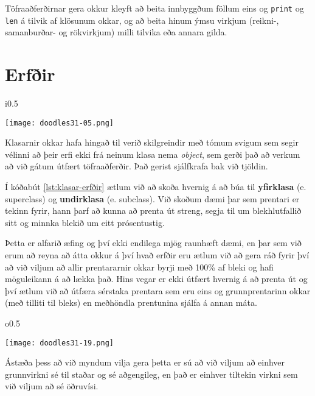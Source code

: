Töfraaðferðirnar gera okkur kleyft að beita innbyggðum föllum eins og \texttt{print} og \texttt{len} á tilvik af klösunum okkar, og að beita hinum ýmsu virkjum (reikni-, samanburðar- og rökvirkjum) milli tilvika eða annara gilda.


\section{Erfðir}\label{uk:klasar-erfðir}
\begin{wrapfigure}{i}{0.5\textwidth} %
	\begin{center}
		\texttt{[image: doodles31-05.png]}
	\end{center}
\end{wrapfigure}
Klasarnir okkar hafa hingað til verið skilgreindir með tómum svigum sem segir vélinni að þeir erfi ekki frá neinum klasa nema \textit{object}, sem gerði það að verkum að við gátum útfært töfraaðferðir.
Það gerist sjálfkrafa bak við tjöldin.

Í kóðabút \ref{lst:klasar-erfðir} ætlum við að skoða hvernig á að búa til \textbf{yfirklasa} (e. superclass) og \textbf{undirklasa} (e. subclass).
Við skoðum dæmi þar sem prentari er tekinn fyrir, hann þarf að kunna að prenta út streng, segja til um blekhlutfallið sitt og minnka blekið um eitt prósentustig.

Þetta er alfarið æfing og því ekki endilega mjög raunhæft dæmi, en þar sem við erum að reyna að átta okkur á því hvað erfðir eru ætlum við að gera ráð fyrir því að við viljum að allir prentararnir okkar byrji með 100\% af bleki og hafi möguleikann á að lækka það.
Hins vegar er ekki útfært hvernig á að prenta út og því ætlum við að útfæra sérstaka prentara sem eru eins og grunnprentarinn okkar (með tilliti til bleks) en meðhöndla prentunina sjálfa á annan máta.
\begin{wrapfigure}{o}{0.5\textwidth} %
	\begin{center}
		\texttt{[image: doodles31-19.png]}
	\end{center}
\end{wrapfigure}

Ástæða þess að við myndum vilja gera þetta er sú að við viljum að einhver grunnvirkni sé til staðar og sé aðgengileg, en það er einhver tiltekin virkni sem við viljum að sé öðruvísi.

